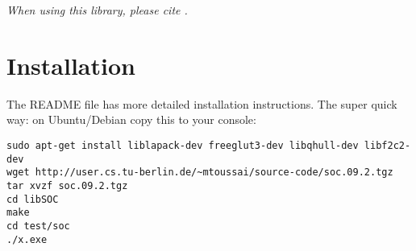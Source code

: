 
\lectureNote
\pdflatex

  \usepackage{listings}

\newcommand{\cmd}[1]{\lstinline$#1$}
\newcommand{\file}[1]{\href{../#1}{\nolinkurl{#1}}}
\newcommand{\namespace}[1]{\href{aico_doc/namespace#1.html}{\nolinkurl{#1}}}
\newcommand{\source}[2]{\href{aico_doc/#1_8#2-source.html}{\nolinkurl{#1.#2}}}
\newcommand{\struct}[2]{\href{aico_doc/struct#1_1_1#2.html}{\nolinkurl{#1::#2}}}
\newcommand{\method}[3]{\href{aico_doc/struct#1_1_1#2.html}{\nolinkurl{#1::#2::#3}}}
\newcommand{\function}[2]{\href{aico_doc/namespace#1.html}{\nolinkurl{#1::#2}}}




\maketitle

\begin{center}
\emph{When using this library, please
cite \cite{@-toussaint:09-icml}.}
\end{center}

\tableofcontents


\section{Installation}

The README file has more detailed installation instructions. The super
quick way: on Ubuntu/Debian copy this to your console:
\begin{lstlisting}
sudo apt-get install liblapack-dev freeglut3-dev libqhull-dev libf2c2-dev
wget http://user.cs.tu-berlin.de/~mtoussai/source-code/soc.09.2.tgz
tar xvzf soc.09.2.tgz
cd libSOC
make
cd test/soc
./x.exe
\end{lstlisting}

